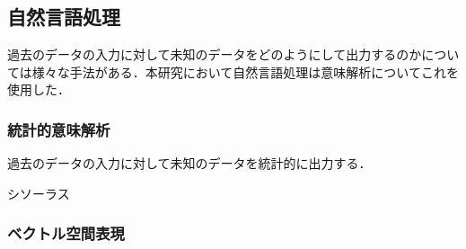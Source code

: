 \subsection{自然言語処理}
\label{tech:NLP}
過去のデータの入力に対して未知のデータをどのようにして出力するのかについては様々な手法がある．本研究において自然言語処理は意味解析についてこれを使用した．

\subsubsection{統計的意味解析}
\label{tech:tokei}
過去のデータの入力に対して未知のデータを統計的に出力する．

\label{tech:Markov}

\label{tech:Copus}

\label{tech:Siso}
シソーラス\cite{siso}

\subsubsection{ベクトル空間表現}
\label{tech:Vector}

\label{tech:Word2vec}

